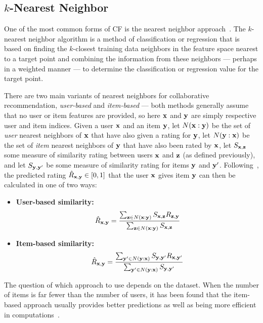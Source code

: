 \subsection{$k$-Nearest Neighbor}
\label{sec:nn}

One of the most common forms of CF is the nearest neighbor
approach~\cite{bellkor}. The $k$-nearest neighbor algorithm is a
method of classification or regression that is based on finding the $k$-closest
training data neighbors in the feature space nearest to a target point and combining the information from these neighbors --- perhaps
in a weighted manner --- to determine the classification or regression value
for the target point. 

There are two main variants of nearest neighbors for collaborative
recommendation, \emph{user-based} and \emph{item-based} --- both
methods generally assume that no user or item features are provided,
so here $\mathbf{x}$ and $\mathbf{y}$ are simply respective user and item indices.
Given a user $\mathbf{x}$ and an item $\mathbf{y}$, let $N(\mathbf{x}:\mathbf{y})$ be the set of
\emph{user} nearest neighbors of $\mathbf{x}$ that have also given a rating
for $\mathbf{y}$, let $N(\mathbf{y}:\mathbf{x})$ be the set of \emph{item} nearest neighbors
of $\mathbf{y}$ that have also been rated by $\mathbf{x}$, let $S_{\mathbf{x},\mathbf{z}}$ some
measure of similarity rating between users $\mathbf{x}$ and $\mathbf{z}$ (as defined
previously), and let $S_{\mathbf{y},\mathbf{y}'}$ be some measure of similarity rating for
items $\mathbf{y}$ and $\mathbf{y}'$.  Following~\cite{bellkor}, the predicted rating
$\hat{R}_{\mathbf{x},\mathbf{y}} \in [0,1]$ that the user $\mathbf{x}$ gives item $\mathbf{y}$ can
then be calculated in one of two ways:
\begin{itemize}
\item {\bf User-based similarity:}
\[
\hat{R}_{\mathbf{x},\mathbf{y}} = \frac{\sum_{\mathbf{z} \in N(\mathbf{x}:\mathbf{y})} {S_{\mathbf{x},\mathbf{z}} R_{\mathbf{z},\mathbf{y}}} } {\sum_{\mathbf{z} \in N(\mathbf{x}:\mathbf{y})}{S_{\mathbf{x},\mathbf{z}}}}
\]
\item {\bf Item-based similarity:}
\[
\hat{R}_{\mathbf{x},\mathbf{y}} = \frac{\sum_{\mathbf{y}' \in N(\mathbf{y}:\mathbf{x})} {S_{\mathbf{y},\mathbf{y}'} R_{\mathbf{x},\mathbf{y}'}} } {\sum_{\mathbf{y}' \in N(\mathbf{y}:\mathbf{x})}{S_{\mathbf{y},\mathbf{y}'}}}
\]
\end{itemize}

The question of which approach to use depends on the dataset. When the
number of items is far fewer than the number of users, it has been
found that the item-based approach usually provides better predictions
as well as being more efficient in computations~\cite{bellkor}.

